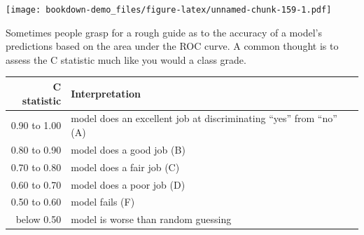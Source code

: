 \documentclass[]{book}
\theoremstyle{definition}
\theoremstyle{definition}
\theoremstyle{definition}
\theoremstyle{remark}
\begin{document}
\texttt{[image: bookdown-demo\_files/figure-latex/unnamed-chunk-159-1.pdf]}

Sometimes people grasp for a rough guide as to the accuracy of a model's
predictions based on the area under the ROC curve. A common thought is
to assess the C statistic much like you would a class grade.

\begin{longtable}[]{@{}rl@{}}
\toprule
\begin{minipage}[b]{0.16\columnwidth}\raggedleft\strut
C statistic\strut
\end{minipage} & \begin{minipage}[b]{0.60\columnwidth}\raggedright\strut
Interpretation\strut
\end{minipage}\tabularnewline
\midrule
\endhead
\begin{minipage}[t]{0.16\columnwidth}\raggedleft\strut
0.90 to 1.00\strut
\end{minipage} & \begin{minipage}[t]{0.60\columnwidth}\raggedright\strut
model does an excellent job at discriminating ``yes'' from ``no''
(A)\strut
\end{minipage}\tabularnewline
\begin{minipage}[t]{0.16\columnwidth}\raggedleft\strut
0.80 to 0.90\strut
\end{minipage} & \begin{minipage}[t]{0.60\columnwidth}\raggedright\strut
model does a good job (B)\strut
\end{minipage}\tabularnewline
\begin{minipage}[t]{0.16\columnwidth}\raggedleft\strut
0.70 to 0.80\strut
\end{minipage} & \begin{minipage}[t]{0.60\columnwidth}\raggedright\strut
model does a fair job (C)\strut
\end{minipage}\tabularnewline
\begin{minipage}[t]{0.16\columnwidth}\raggedleft\strut
0.60 to 0.70\strut
\end{minipage} & \begin{minipage}[t]{0.60\columnwidth}\raggedright\strut
model does a poor job (D)\strut
\end{minipage}\tabularnewline
\begin{minipage}[t]{0.16\columnwidth}\raggedleft\strut
0.50 to 0.60\strut
\end{minipage} & \begin{minipage}[t]{0.60\columnwidth}\raggedright\strut
model fails (F)\strut
\end{minipage}\tabularnewline
\begin{minipage}[t]{0.16\columnwidth}\raggedleft\strut
below 0.50\strut
\end{minipage} & \begin{minipage}[t]{0.60\columnwidth}\raggedright\strut
model is worse than random guessing\strut
\end{minipage}\tabularnewline
\bottomrule
\end{longtable}
\end{document}
